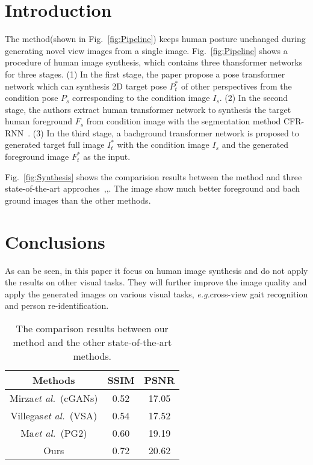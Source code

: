 \documentclass[10pt,twocolumn,letterpaper]{article}
\begin{document}
\section{Introduction}
The method(shown in Fig.~\ref{fig:Pipeline}) keeps human posture unchanged during generating novel view images from a single image. Fig.~\ref{fig:Pipeline} shows a procedure of human image synthesis, which contains three thansformer networks for three stages. (1) In the first stage, the paper propose a pose transformer network which can synthesis 2D target pose $P_t^*$ of other perspectives from the condition pose $P_s$ corresponding to the condition image $I_s$. (2) In the second stage, the authors extract human transformer network to synthesis the target human foreground $F_s$ from condition image with the segmentation method CFR-RNN~\cite{Zheng2016Conditional}. (3) In the third stage, a bachground transformer network is proposed to generated target full image $I_t^*$ with the condition image $I_s$ and the generated foreground image $F_t^*$ as the input.\par
Fig.~\ref{fig:Synthesis} shows the comparision results between the method and three state-of-the-art approches~\cite{MirzaO14},\cite{Ruben_2017_Lea},\cite{MaJSSTG17}. The image show much better foreground and bach ground images than the other methods.\par

\section{Conclusions}
As can be seen, in this paper it focus on human image
synthesis and do not apply the results on other visual
tasks. They will further improve the image quality
and apply the generated images on various visual tasks,
\emph{e.g.}cross-view gait recognition and person re-identification.\par

\begin{table}
\begin{center}
\caption{The comparison results between our method and the other state-of-the-art methods.\cite{Si_2018_CVPR}}
\begin{tabular}{ccc}
\toprule
Methods & SSIM & PSNR \\
\midrule
Mirza\emph{et al.}~\cite{MirzaO14}(cGANs) & 0.52 & 17.05 \\
Villegas\emph{et al.}~\cite{Ruben_2017_Lea}(VSA) & 0.54 & 17.52 \\
Ma\emph{et al.}~\cite{MaJSSTG17}(PG2) & 0.60 & 19.19 \\
Ours & 0.72 & 20.62 \\
\bottomrule
\end{tabular}
\label{Tab:Experiment}
\end{center}
\end{table}


{\small


}
\end{document}
